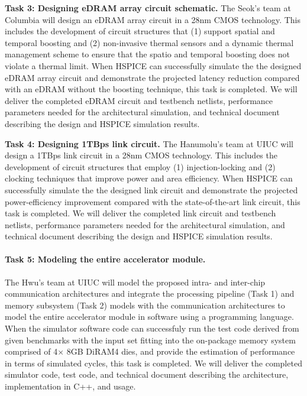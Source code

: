 \noindent
\textbf{Task 3: Designing eDRAM array circuit schematic.}
The Seok's team at Columbia will design an eDRAM array circuit in a 28nm CMOS technology.
This includes the development of circuit structures that (1) support spatial and temporal boosting and (2) non-invasive thermal sensors and a dynamic thermal management scheme to ensure that the spatio and temporal boosting does not violate a thermal limit.
When HSPICE can successfully simulate the the designed eDRAM array circuit and demonstrate the projected latency reduction compared with an eDRAM without the boosting technique, this task is completed.
We will deliver the completed eDRAM circuit and testbench netlists, performance parameters needed for the architectural simulation, and technical document describing the design and HSPICE simulation results.

\noindent
\textbf{Task 4: Designing 1TBps link circuit.}
The Hanumolu's team at UIUC will design a 1TBps link circuit in a 28nm CMOS technology.
This includes the development of circuit structures that employ (1) injection-locking and (2) clocking techniques that improve power and area efficiency. 
When HSPICE can successfully simulate the the designed link circuit and demonstrate the projected power-efficiency improvement compared with the state-of-the-art link circuit, this task is completed.
We will deliver the completed link circuit and testbench netlists, performance parameters needed for the architectural simulation, and technical document describing the design and HSPICE simulation results.

\noindent
\paragraph{Task 5: Modeling the entire accelerator module.}
The Hwu's team at UIUC will model the proposed intra- and inter-chip communication architectures and integrate the processing pipeline (Task 1) and memory subsystem (Task 2) models with the communication architectures to model the entire accelerator module in software using a programming language. 
When the simulator software code can successfuly run the test code derived from given benchmarks with the input set fitting into the on-package memory system comprised of 4$\times$ 8GB DiRAM4 dies, and provide the estimation of performance in terms of simulated cycles, this task is completed.
We will deliver the completed simulator code, test code, and technical document describing the architecture, implementation in C++, and usage.


